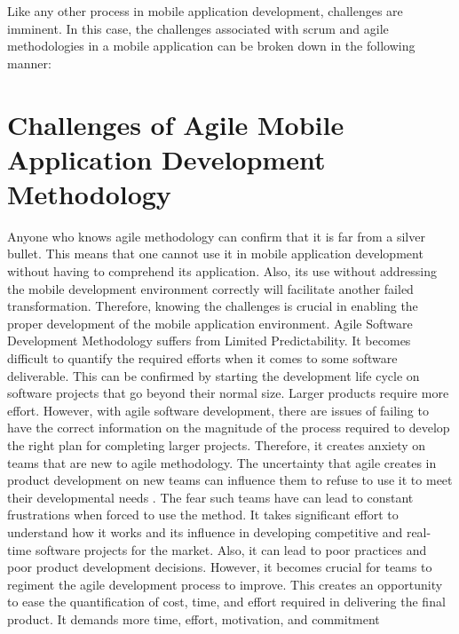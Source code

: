 \documentclass{article}
\begin{document}
Like any other process in mobile application development, challenges are imminent. In this case, the challenges associated with scrum and agile methodologies in a mobile application can be broken down in the following manner: 

\section*{Challenges of Agile Mobile Application Development Methodology}
Anyone who knows agile methodology can confirm that it is far from a silver bullet. This means that one cannot use it in mobile application development without having to comprehend its application. Also, its use without addressing the mobile development environment correctly will facilitate another failed transformation. Therefore, knowing the challenges is crucial in enabling the proper development of the mobile application environment. Agile Software Development Methodology suffers from Limited Predictability. It becomes difficult to quantify the required efforts when it comes to some software deliverable. This can be confirmed by starting the development life cycle on software projects that go beyond their normal size. Larger products require more effort. However, with agile software development, there are issues of failing to have the correct information on the magnitude of the process required to develop the right plan for completing larger projects. Therefore, it creates anxiety on teams that are new to agile methodology. The uncertainty that agile creates in product development on new teams can influence them to refuse to use it to meet their developmental needs \cite{tondel2019collaborative}. The fear such teams have can lead to constant frustrations when forced to use the method. It takes significant effort to understand how it works and its influence in developing competitive and real-time software projects for the market. Also, it can lead to poor practices and poor product development decisions. However, it becomes crucial for teams to regiment the agile development process to improve. This creates an opportunity to ease the quantification of cost, time, and effort required in delivering the final product. It demands more time, effort, motivation, and commitment
\end{document}
